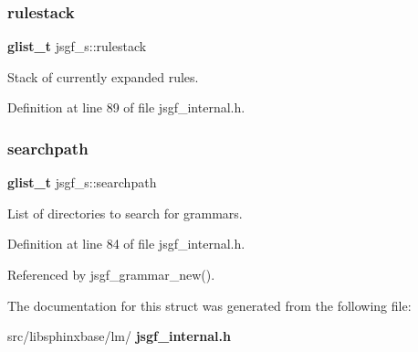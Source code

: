 \mbox{\label{structjsgf__s_a0980112df6f2f591e64158266eb04b69}} 
\subsubsection{rulestack}
{\footnotesize\ttfamily \textbf{ glist\+\_\+t} jsgf\+\_\+s\+::rulestack}



Stack of currently expanded rules. 



Definition at line 89 of file jsgf\+\_\+internal.\+h.

\mbox{\label{structjsgf__s_aabb207f0909c661a831e5f931dd9f60e}} 
\subsubsection{searchpath}
{\footnotesize\ttfamily \textbf{ glist\+\_\+t} jsgf\+\_\+s\+::searchpath}



List of directories to search for grammars. 



Definition at line 84 of file jsgf\+\_\+internal.\+h.



Referenced by jsgf\+\_\+grammar\+\_\+new().



The documentation for this struct was generated from the following file\+:\begin{DoxyCompactItemize}
\item 
src/libsphinxbase/lm/\textbf{ jsgf\+\_\+internal.\+h}\end{DoxyCompactItemize}
